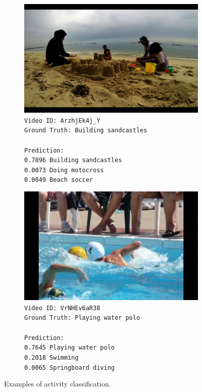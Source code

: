 \documentclass{article}
\begin{document}
\begin{figure}[h]
\centering
\begin{subfigure}[b]{.5\textwidth}
    \includegraphics[width=0.9\linewidth]{img/results_visualization_classification_1}
    \texttt{Video ID: ArzhjEk4j\_Y \\
    Ground Truth: Building sandcastles \\
    \\
    Prediction: \\
    0.7896	Building sandcastles \\
    0.0073	Doing motocross \\
    0.0049	Beach soccer \\}
\end{subfigure}%
\begin{subfigure}[b]{.5\textwidth}
    \includegraphics[width=0.9\linewidth]{img/results_visualization_classification_4}
    \texttt{Video ID: VrNHEv6aR38 \\
    Ground Truth: Playing water polo \\
    \\
    Prediction: \\
    0.7645	Playing water polo \\
    0.2018	Swimming \\
    0.0065	Springboard diving\\}
\end{subfigure}

\caption{Examples of activity classification.}
\label{fig:example_results_classification}
\end{figure}
\end{document}
